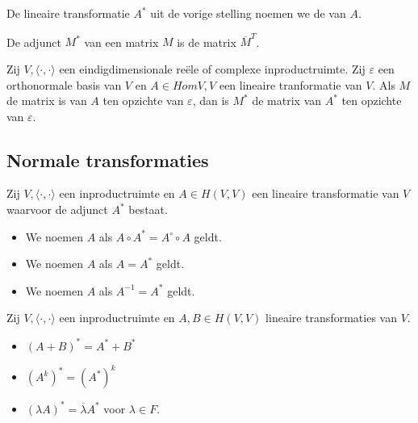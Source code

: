 \documentclass[main.tex]{subfiles}
\begin{document}
\begin{de}
  De lineaire transformatie $A^{*}$ uit de vorige stelling noemen we de  van $A$.
\end{de}

\begin{de}
  De adjunct $M^{*}$ van een matrix $M$ is de matrix $\overline{M}^{T}$.
\end{de}

\begin{ei}
  Zij $V,\langle\cdot,\cdot\rangle$ een eindigdimensionale re\"ele of complexe inproductruimte. 
  Zij $\varepsilon$ een orthonormale basis van $V$ en $A \in Hom{V,V}$ een lineaire tranformatie van $V$.
  Als $M$ de matrix is van $A$ ten opzichte van $\varepsilon$, dan is $M^{*}$ de matrix van $A^{*}$ ten opzichte van $\varepsilon$.
\end{ei}

\subsection{Normale transformaties}
\label{sec:norm-transf-1}

\begin{de}
  Zij $V,\langle\cdot,\cdot\rangle$ een inproductruimte en $A\in H(V,V)$ een lineaire transformatie van $V$ waarvoor de adjunct $A^{*}$ bestaat.
  \begin{itemize}
  \item We noemen $A$  als $A\circ A^{*} = A^{\circ} \circ A$ geldt.
  \item We noemen $A$  als $A=A^{*}$ geldt.
  \item We noemen $A$  als $A^{-1} = A^{*}$ geldt.
  \end{itemize}
\end{de}

\begin{lem}
  Zij $V,\langle\cdot,\cdot\rangle$ een inproductruimte en $A,B \in H(V,V)$ lineaire transformaties van $V$.
  \begin{itemize}
  \item $(A+B)^{*} = A^{*} + B^{*}$
  \item $(A^{k})^{*} = (A^{*})^{k}$
  \item $(\lambda A)^{*} = \overline{\lambda}A^{*}$ voor $\lambda \in F$.
  \end{itemize}
\end{lem}
\end{document}
